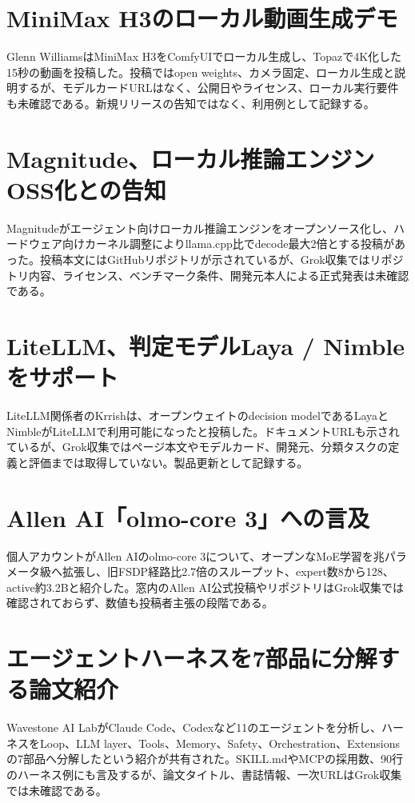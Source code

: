 \section{MiniMax H3のローカル動画生成デモ}
Glenn WilliamsはMiniMax H3をComfyUIでローカル生成し、Topazで4K化した15秒の動画を投稿した。投稿ではopen weights、カメラ固定、ローカル生成と説明するが、モデルカードURLはなく、公開日やライセンス、ローカル実行要件も未確認である。新規リリースの告知ではなく、利用例として記録する。

\section{Magnitude、ローカル推論エンジンOSS化との告知}
Magnitudeがエージェント向けローカル推論エンジンをオープンソース化し、ハードウェア向けカーネル調整によりllama.cpp比でdecode最大2倍とする投稿があった。投稿本文にはGitHubリポジトリが示されているが、Grok収集ではリポジトリ内容、ライセンス、ベンチマーク条件、開発元本人による正式発表は未確認である。

\section{LiteLLM、判定モデルLaya / Nimbleをサポート}
LiteLLM関係者のKrrishは、オープンウェイトのdecision modelであるLayaとNimbleがLiteLLMで利用可能になったと投稿した。ドキュメントURLも示されているが、Grok収集ではページ本文やモデルカード、開発元、分類タスクの定義と評価までは取得していない。製品更新として記録する。

\section{Allen AI「olmo-core 3」への言及}
個人アカウントがAllen AIのolmo-core 3について、オープンなMoE学習を兆パラメータ級へ拡張し、旧FSDP経路比2.7倍のスループット、expert数8から128、active約3.2Bと紹介した。窓内のAllen AI公式投稿やリポジトリはGrok収集では確認されておらず、数値も投稿者主張の段階である。

\section{エージェントハーネスを7部品に分解する論文紹介}
Wavestone AI LabがClaude Code、Codexなど11のエージェントを分析し、ハーネスをLoop、LLM layer、Tools、Memory、Safety、Orchestration、Extensionsの7部品へ分解したという紹介が共有された。SKILL.mdやMCPの採用数、90行のハーネス例にも言及するが、論文タイトル、書誌情報、一次URLはGrok収集では未確認である。

